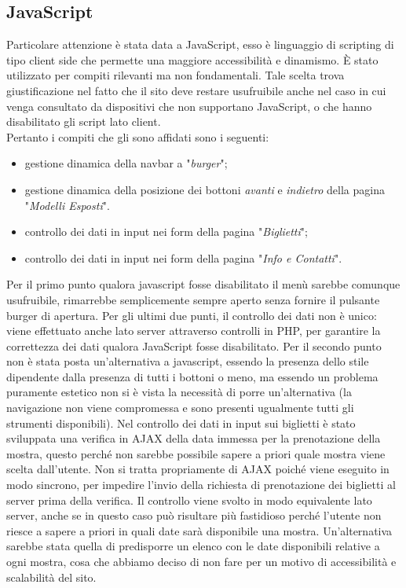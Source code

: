 \subsection{JavaScript}
Particolare attenzione è stata data a JavaScript, esso è linguaggio di scripting di tipo client side che permette una	maggiore accessibilità e dinamismo. È stato utilizzato per compiti rilevanti ma non fondamentali. Tale scelta trova giustificazione nel fatto che il sito deve restare usufruibile anche nel caso in cui venga consultato da dispositivi che non supportano JavaScript, o che hanno disabilitato gli script lato client.\\
Pertanto i compiti che gli sono affidati sono i seguenti:
\begin{itemize}
	\item gestione dinamica della navbar a "\textit{burger}";
	\item gestione dinamica della posizione dei bottoni \textit{avanti} e \textit{indietro} della pagina "\textit{Modelli Esposti}".
	\item controllo dei dati in input nei form della pagina "\textit{Biglietti}";
	\item controllo dei dati in input nei form della pagina "\textit{Info e Contatti}".
\end{itemize}
Per il primo punto qualora javascript fosse disabilitato il menù sarebbe comunque usufruibile, rimarrebbe semplicemente sempre aperto senza fornire il pulsante burger di apertura.
Per gli ultimi due punti, il controllo dei dati non è unico: viene effettuato anche lato server attraverso controlli in PHP, per garantire la correttezza dei dati qualora JavaScript fosse disabilitato.
Per il secondo punto non è stata posta un'alternativa a javascript, essendo la presenza dello stile dipendente dalla presenza di tutti i bottoni o meno, ma essendo un problema puramente estetico non si è vista la necessità di porre un'alternativa (la navigazione non viene compromessa e sono presenti ugualmente tutti gli strumenti disponibili).
Nel controllo dei dati in input sui biglietti è stato sviluppata una verifica in AJAX della data immessa per la prenotazione della mostra, questo perché non sarebbe possibile sapere a priori quale mostra viene scelta dall'utente.
Non si tratta propriamente di AJAX poiché viene eseguito in modo sincrono, per impedire l'invio della richiesta di prenotazione dei biglietti al server prima della verifica. 
Il controllo viene svolto in modo equivalente lato server, anche se in questo caso può risultare più fastidioso perché l'utente non riesce a sapere a priori in quali date sarà disponibile una mostra.
Un'alternativa sarebbe stata quella di predisporre un elenco con le date disponibili relative a ogni mostra, cosa che abbiamo deciso di non fare per un motivo di accessibilità e scalabilità del sito.
